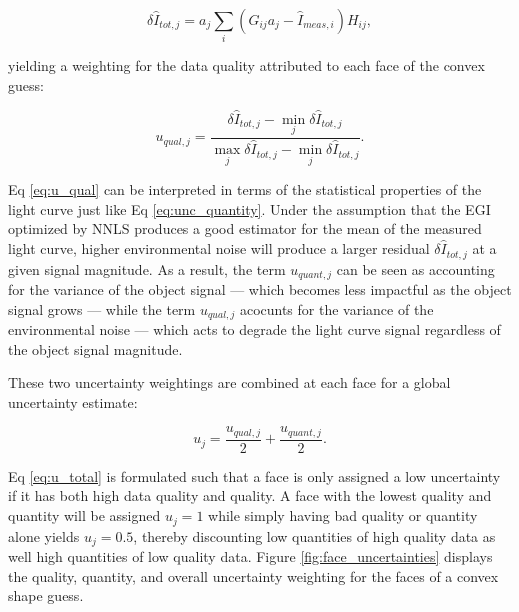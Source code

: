 \begin{equation}
  \delta \hat{I}_{tot,j} = a_j \sum_{i}{\left( G_{ij} a_j - \hat{I}_{meas,i} \right) H_{ij}},
\end{equation}

yielding a weighting for the data quality attributed to each face of the convex guess:

\begin{equation} \label{eq:u_qual}
  u_{qual,j} = \frac{\delta \hat{I}_{tot,j} - \min_{j}{\delta \hat{I}_{tot,j}}}{\max_{j}{\delta \hat{I}_{tot,j}} - \min_{j}{\delta \hat{I}_{tot,j}}}.
\end{equation}

Eq \ref{eq:u_qual} can be interpreted in terms of the statistical properties of the light curve just like Eq \ref{eq:unc_quantity}. Under the assumption that the EGI optimized by NNLS produces a good estimator for the mean of the measured light curve, higher environmental noise will produce a larger residual $\delta \hat{I}_{tot,j}$ at a given signal magnitude. As a result, the term $u_{quant,j}$ can be seen as accounting for the variance of the object signal --- which becomes less impactful as the object signal grows --- while the term $u_{qual,j}$ acocunts for the variance of the environmental noise --- which acts to degrade the light curve signal regardless of the object signal magnitude.

These two uncertainty weightings are combined at each face for a global uncertainty estimate:

\begin{equation} \label{eq:u_total}
  u_{j} = \frac{u_{qual,j}}{2} + \frac{u_{quant,j}}{2}.
\end{equation}

Eq \ref{eq:u_total} is formulated such that a face is only assigned a low uncertainty if it has both high data quality and quality. A face with the lowest quality and quantity will be assigned $u_{j} = 1$ while simply having bad quality or quantity alone yields $u_j = 0.5$, thereby discounting low quantities of high quality data as well high quantities of low quality data. Figure \ref{fig:face_uncertainties} displays the quality, quantity, and overall uncertainty weighting for the faces of a convex shape guess.

